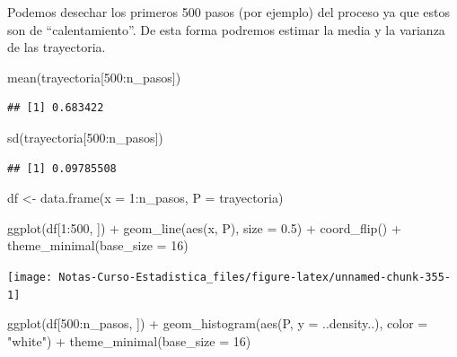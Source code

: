 \documentclass[
  12pt,
]{book}
\newenvironment{Shaded}{\begin{snugshade}}{\end{snugshade}}
\newcommand{\AttributeTok}[1]{\textcolor[rgb]{0.77,0.63,0.00}{#1}}
\newcommand{\DecValTok}[1]{\textcolor[rgb]{0.00,0.00,0.81}{#1}}
\newcommand{\FloatTok}[1]{\textcolor[rgb]{0.00,0.00,0.81}{#1}}
\newcommand{\FunctionTok}[1]{\textcolor[rgb]{0.00,0.00,0.00}{#1}}
\newcommand{\NormalTok}[1]{#1}
\newcommand{\OtherTok}[1]{\textcolor[rgb]{0.56,0.35,0.01}{#1}}
\newcommand{\SpecialCharTok}[1]{\textcolor[rgb]{0.00,0.00,0.00}{#1}}
\newcommand{\StringTok}[1]{\textcolor[rgb]{0.31,0.60,0.02}{#1}}
\theoremstyle{definition}
\theoremstyle{definition}
\theoremstyle{definition}
\theoremstyle{definition}
\theoremstyle{remark}
\begin{document}
Podemos desechar los primeros 500 pasos (por ejemplo) del proceso ya que estos son de ``calentamiento''. De esta forma podremos estimar la media y la varianza de las trayectoria.

\begin{Shaded}
\begin{Highlighting}[]
\FunctionTok{mean}\NormalTok{(trayectoria[}\DecValTok{500}\SpecialCharTok{:}\NormalTok{n\_pasos])}
\end{Highlighting}
\end{Shaded}

\begin{verbatim}
## [1] 0.683422
\end{verbatim}

\begin{Shaded}
\begin{Highlighting}[]
\FunctionTok{sd}\NormalTok{(trayectoria[}\DecValTok{500}\SpecialCharTok{:}\NormalTok{n\_pasos])}
\end{Highlighting}
\end{Shaded}

\begin{verbatim}
## [1] 0.09785508
\end{verbatim}

\begin{Shaded}
\begin{Highlighting}[]
\NormalTok{df }\OtherTok{\textless{}{-}} \FunctionTok{data.frame}\NormalTok{(}\AttributeTok{x =} \DecValTok{1}\SpecialCharTok{:}\NormalTok{n\_pasos, }\AttributeTok{P =}\NormalTok{ trayectoria)}

\FunctionTok{ggplot}\NormalTok{(df[}\DecValTok{1}\SpecialCharTok{:}\DecValTok{500}\NormalTok{, ]) }\SpecialCharTok{+} \FunctionTok{geom\_line}\NormalTok{(}\FunctionTok{aes}\NormalTok{(x, P), }\AttributeTok{size =} \FloatTok{0.5}\NormalTok{) }\SpecialCharTok{+}
    \FunctionTok{coord\_flip}\NormalTok{() }\SpecialCharTok{+} \FunctionTok{theme\_minimal}\NormalTok{(}\AttributeTok{base\_size =} \DecValTok{16}\NormalTok{)}
\end{Highlighting}
\end{Shaded}

\begin{center}\texttt{[image: Notas-Curso-Estadistica\_files/figure-latex/unnamed-chunk-355-1]} \end{center}

\begin{Shaded}
\begin{Highlighting}[]
\FunctionTok{ggplot}\NormalTok{(df[}\DecValTok{500}\SpecialCharTok{:}\NormalTok{n\_pasos, ]) }\SpecialCharTok{+} \FunctionTok{geom\_histogram}\NormalTok{(}\FunctionTok{aes}\NormalTok{(P, }\AttributeTok{y =}\NormalTok{ ..density..),}
    \AttributeTok{color =} \StringTok{"white"}\NormalTok{) }\SpecialCharTok{+} \FunctionTok{theme\_minimal}\NormalTok{(}\AttributeTok{base\_size =} \DecValTok{16}\NormalTok{)}
\end{Highlighting}
\end{Shaded}
\end{document}
